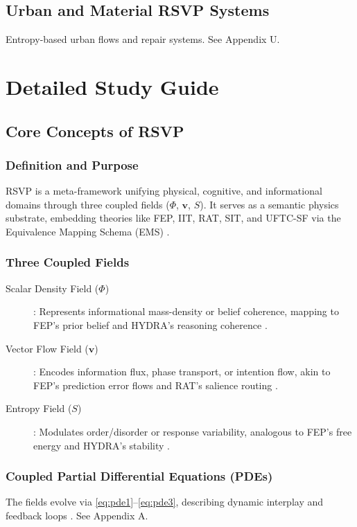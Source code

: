 \documentclass[12pt]{report}
\newcommand{\PhiRSVP}{\Phi}
\newcommand{\vRSVP}{\mathbf{v}}
\newcommand{\SRSVP}{S}
\begin{document}
\chapter{Urban and Material RSVP Systems}
Entropy-based urban flows and repair systems. See Appendix U.

\part{Detailed Study Guide}

\chapter{Core Concepts of RSVP}
\section{Definition and Purpose}
RSVP is a meta-framework unifying physical, cognitive, and informational domains through three coupled fields (\(\PhiRSVP\), \(\vRSVP\), \(\SRSVP\)). It serves as a semantic physics substrate, embedding theories like FEP, IIT, RAT, SIT, and UFTC-SF via the Equivalence Mapping Schema (EMS) \citep{RSVPMeta2025}.

\section{Three Coupled Fields}
\begin{description}
    \item[Scalar Density Field (\(\PhiRSVP\))]: Represents informational mass-density or belief coherence, mapping to FEP’s prior belief \citep{Friston2010} and HYDRA’s reasoning coherence \citep{HYDRA2025}.
    \item[Vector Flow Field (\(\vRSVP\))]: Encodes information flux, phase transport, or intention flow, akin to FEP’s prediction error flows and RAT’s salience routing \citep{RAT2025}.
    \item[Entropy Field (\(\SRSVP\))]: Modulates order/disorder or response variability, analogous to FEP’s free energy and HYDRA’s stability \citep{Friston2010, HYDRA2025}.
\end{description}

\section{Coupled Partial Differential Equations (PDEs)}
The fields evolve via \eqref{eq:pde1}--\eqref{eq:pde3}, describing dynamic interplay and feedback loops \citep{RSVPMeta2025}. See Appendix A.
\end{document}

